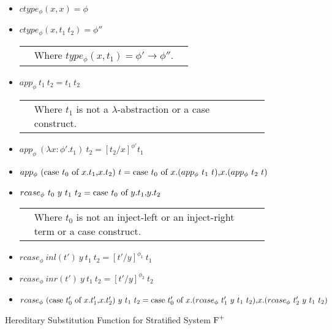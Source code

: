 \begin{figure}[t]
  \small
  \begin{itemize}
  \item[] $ctype_\phi(x,x) = \phi$
  \item[] $ctype_\phi(x,t_1\ t_2) = \phi''$\\
    \begin{tabular}{lll}
      & Where $type_\phi(x,t_1) = \phi' \to \phi''$.
    \end{tabular}    
  \end{itemize}
  
  \begin{itemize}
  \item[] $app_\phi\ t_1\ t_2 = t_1\ t_2$\\
    \begin{tabular}{lll}
      & Where $t_1$ is not a $\lambda$-abstraction or a case construct.
    \end{tabular}
  \item[] $app_\phi\ (\lambda x:\phi'.t_1)\ t_2 = [t_2/x]^{\phi'} t_1$
  \item[] $app_\phi\ (\ccon{t_0}{x}{t_1}{t_2})\ t = 
    \ccon{t_0}{x}{(app_\phi\ t_1\ t)}{(app_\phi\ t_2\ t)}$
  \end{itemize}
  
  \begin{itemize}
  \item[] $rcase_{\phi}\ t_0\ y\ t_1\ t_2 = \mbox{case}\ t_0\ \text{of}\ y\text{.}t_1\text{,}y\text{.}t_2$\\
    \begin{tabular}{lll}
      & Where $t_0$ is not an inject-left or an inject-right term or a case construct.
    \end{tabular}
  \item[] $rcase_{\phi}\ inl(t')\ y\ t_1\ t_2 = [t'/y]^{\phi_1}\ t_1$
  \item[] $rcase_{\phi}\ inr(t')\ y\ t_1\ t_2 = [t'/y]^{\phi_2}\ t_2$
  \item[] $rcase_{\phi}\ (\ccon{t'_0}{x}{t'_1}{t'_2})\ y\ t_1\ t_2 = 
    \ccon{t'_0}{x}{(rcase_{\phi}\ t'_1\ y\ t_1\ t_2)}{(rcase_{\phi}\ t'_2\ y\ t_1\ t_2)}$
  \end{itemize}
  \caption{Hereditary Substitution Function for Stratified System $\mbox{F}^{+}$}
  \label{fig:hereditary_substitution_function_part1}
\end{figure}

